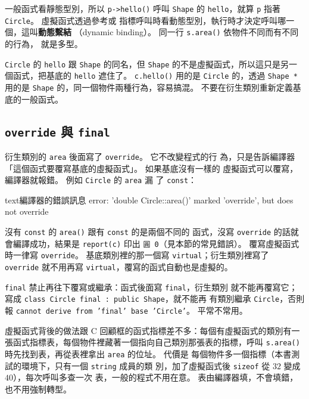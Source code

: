 一般函式看靜態型別，所以 \texttt{p->hello()} 呼叫 \texttt{Shape} 的
\texttt{hello}，就算 \texttt{p} 指著 \texttt{Circle}。 虛擬函式透過參考或
指標呼叫時看動態型別，執行時才決定呼叫哪一個，這叫\textbf{動態繫結}
（dynamic binding）。 同一行 \texttt{s.area()} 依物件不同而有不同的行為，
就是多型。

\texttt{Circle} 的 \texttt{hello} 跟 \texttt{Shape} 的同名，但
\texttt{Shape} 的不是虛擬函式，所以這只是另一個函式，把基底的
\texttt{hello} 遮住了。 \texttt{c.hello()} 用的是 \texttt{Circle} 的，透過
\texttt{Shape *} 用的是 \texttt{Shape} 的，同一個物件兩種行為，容易搞混。
不要在衍生類別重新定義基底的一般函式。

\subsection{\texttt{override} 與 \texttt{final}}

衍生類別的 \texttt{area} 後面寫了 \texttt{override}。 它不改變程式的行
為，只是告訴編譯器「這個函式要覆寫基底的虛擬函式」。 如果基底沒有一樣的
虛擬函式可以覆寫，編譯器就報錯。 例如 \texttt{Circle} 的 \texttt{area} 漏
了 \texttt{const}：

\begin{code}{text}{編譯器的錯誤訊息}
error: 'double Circle::area()' marked 'override', but does not override
\end{code}

沒有 \texttt{const} 的 \texttt{area()} 跟有 \texttt{const} 的是兩個不同的
函式，沒寫 \texttt{override} 的話就會編譯成功，結果是 \texttt{report(c)}
印出 \texttt{圓 0}（見本節的常見錯誤）。 覆寫虛擬函式時一律寫
\texttt{override}。 基底類別裡的那一個寫 \texttt{virtual}；衍生類別裡寫了
\texttt{override} 就不用再寫 \texttt{virtual}，覆寫的函式自動也是虛擬的。

\texttt{final} 禁止再往下覆寫或繼承：函式後面寫 \texttt{final}，衍生類別
就不能再覆寫它；寫成 \texttt{class Circle final : public Shape}，就不能再
有類別繼承 \texttt{Circle}，否則報 \texttt{cannot derive from 'final' base
'Circle'}。 平常不常用。

虛擬函式背後的做法跟 C 回顧框的函式指標差不多：每個有虛擬函式的類別有一
張函式指標表，每個物件裡藏著一個指向自己類別那張表的指標，呼叫
\texttt{s.area()} 時先找到表，再從表裡拿出 \texttt{area} 的位址。 代價是
每個物件多一個指標（本書測試的環境下，只有一個 \texttt{string} 成員的類
別，加了虛擬函式後 \texttt{sizeof} 從 $32$ 變成 $40$），每次呼叫多查一次
表，一般的程式不用在意。 表由編譯器填，不會填錯，也不用強制轉型。

